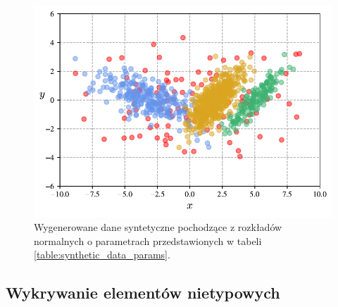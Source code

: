 \documentclass[12pt,a4paper,oneside]{book}
\theoremstyle{definition}
\begin{document}
\begin{figure}[H]
    \centering
    \includegraphics[scale=0.65]{synthetic_data}
    \vspace{-0.5cm} 
    \caption{Wygenerowane dane syntetyczne pochodzące z rozkładów normalnych o parametrach przedstawionych w tabeli \ref{table:synthetic_data_params}.}
    \label{fig:synthetic_data}
\end{figure}

\subsection*{Wykrywanie elementów nietypowych}
\end{document}
